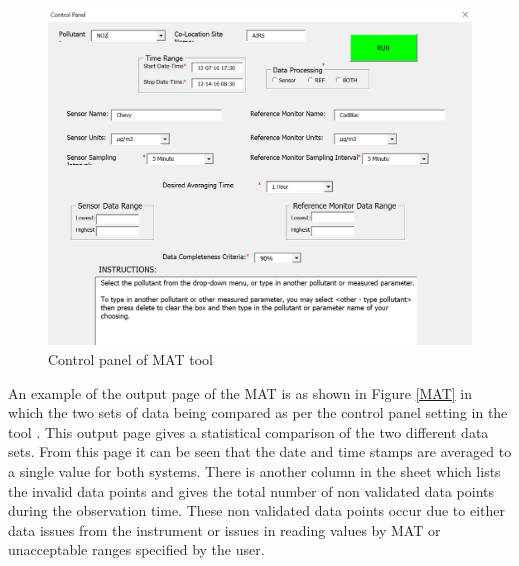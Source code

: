 \begin{figure}[h]
  \begin{center}
  \includegraphics[scale=0.51]{./images/figure43.png}
  \end{center}
  \caption{Control panel of MAT tool  \cite{National2017}}
  \label{controlpanel}
  \hspace{1 cm}
\end{figure}








An example of the output page of the MAT is as shown in Figure \ref{MAT} in which the two sets of data being compared as per the control panel setting in the tool \cite{National2017}.
This output page gives a statistical comparison of the two different data sets. From this page it can be seen that the date and time stamps are averaged to a single value for both systems. There is another column in the sheet which lists the invalid data points and gives the total number of non validated data points during the observation time. These non validated data points occur due to either data issues from the instrument or issues in reading values by MAT or unacceptable ranges specified by the user.

